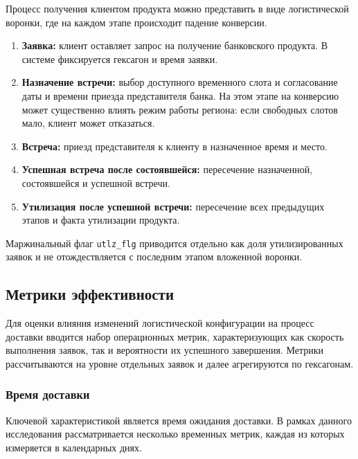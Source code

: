 \documentclass[14pt,a4paper]{extarticle}
\begin{document}
Процесс получения клиентом продукта можно представить в виде логистической воронки, где на каждом этапе происходит падение конверсии.
\begin{enumerate}
    \item \textbf{Заявка:} клиент оставляет запрос на получение банковского продукта. В системе фиксируется гексагон и время заявки.
    \item \textbf{Назначение встречи:} выбор доступного временного слота и согласование даты и времени приезда представителя банка. На этом этапе на конверсию может существенно влиять режим работы региона: если свободных слотов мало, клиент может отказаться.
    \item \textbf{Встреча:} приезд представителя к клиенту в назначенное время и место.
    \item \textbf{Успешная встреча после состоявшейся:} пересечение назначенной, состоявшейся и успешной встречи.
    \item \textbf{Утилизация после успешной встречи:} пересечение всех предыдущих этапов и факта утилизации продукта.
\end{enumerate}
Маржинальный флаг \texttt{utlz\_flg} приводится отдельно как доля утилизированных заявок и не отождествляется с последним этапом вложенной воронки.

\subsection{Метрики эффективности}

Для оценки влияния изменений логистической конфигурации на процесс доставки вводится набор операционных метрик, характеризующих как скорость выполнения заявок, так и вероятности их успешного завершения. Метрики рассчитываются на уровне отдельных заявок и далее агрегируются по гексагонам.

\subsubsection{Время доставки}

Ключевой характеристикой является время ожидания доставки. В рамках данного исследования рассматривается несколько временных метрик, каждая из которых измеряется в календарных днях.
\end{document}
